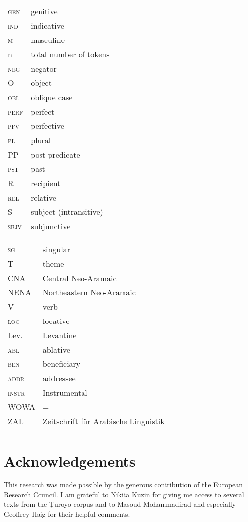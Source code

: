 \documentclass[output=paper,colorlinks,citecolor=brown,draftmode]{langscibook}
\begin{document}
\begin{tabularx}{.45\textwidth}{@{}lQ@{}}
\textsc{gen} & genitive \\
\textsc{ind} & indicative \\
\textsc{m} & masculine \\
n & total number of tokens \\
\textsc{neg} & negator \\
O & {object} \\
\textsc{obl} & {oblique} case \\
\textsc{perf} & perfect \\
\textsc{pfv} & perfective \\
\textsc{pl} & plural \\
PP & post-predicate \\
\textsc{pst} & past \\
R & {recipient} \\
\textsc{rel} & relative \\
S & subject (intransitive) \\
\textsc{sbjv} & subjunctive \\
\end{tabularx}%
\begin{tabularx}{.45\textwidth}{@{}lQ@{}}
\textsc{sg} & singular \\
T & theme \\
CNA & Central Neo-Aramaic \\
NENA & Northeastern Neo-Aramaic \\
V & {verb} \\
\textsc{loc} & {locative} \\
Lev. & Levantine \\
\textsc{abl} & {ablative} \\
\textsc{ben} & beneficiary \\
\textsc{addr} & addressee \\
\textsc{instr} & Instrumental \\
WOWA & = \citet{Haig.Stilo.Dogan.Schiborr2022} \\
ZAL & Zeitschrift für Arabische Linguistik \\
\\
\end{tabularx}

\section*{Acknowledgements}

This research was made possible by the generous contribution of the European Research Council. I am grateful to Nikita Kuzin for giving me access to several texts from the Ṭuroyo corpus and to Masoud Mohammadirad and especially Geoffrey Haig for their helpful comments.



\sloppy
\printbibliography[heading=subbibliography,notkeyword=this]
\end{document}
